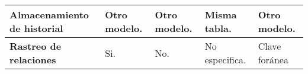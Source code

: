 \begin{table}[h]
\begin{tabular}{| p{} | p{} | p{}| p{} | p{} |}
\textbf{Almacenamiento de historial} & Otro modelo.                                                                 & Otro modelo.                                                                                                             & Misma tabla.                                                                                                       & Otro modelo.                                  \\ \hline
\textbf{Rastreo de relaciones}       & Si.                                                                          & No.                                                                                                                      & No especifica.                                                                                                     & Clave foránea                                 \\ \hline
\end{tabular}
\end{table}
